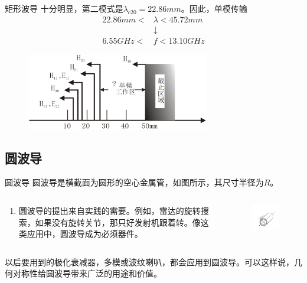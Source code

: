 \begin{frame}{矩形波导}
    十分明显，第二模式是$\lambda_{c20}=22.86mm$。因此，单模传输
    \begin{align*}
        22.86mm< & \lambda<45.72mm \\
                 & \downarrow      \\
        6.55GHz< & f<13.10GHz
    \end{align*}
    \begin{figure}
        \includegraphics[width=8cm]{Cha6//fig6-15.png}
    \end{figure}
\end{frame}

\subsection{圆波导}
\begin{frame}{圆波导}
    圆波导是横截面为圆形的空心金属管，如图所示，其尺寸半径为$R$。
    \begin{columns}
        \begin{column}{0.4\linewidth}
            \begin{enumerate}
                \item 圆波导的提出来自实践的需要。例如，雷达的旋转搜索，如果没有旋转关节，那只好发射机跟着转。像这类应用中，圆波导成为必须器件。
                      \saveenum
            \end{enumerate}
        \end{column}
        \begin{column}{0.6\linewidth}
            \begin{figure}
                \includegraphics[width=6cm]{Cha6//fig6-16.png}
            \end{figure}
        \end{column}
    \end{columns}
    以后要用到的极化衰减器，多模或波纹喇叭，都会应用到圆波导。可以这样说，几何对称性给圆波导带来广泛的用途和价值。
\end{frame}

